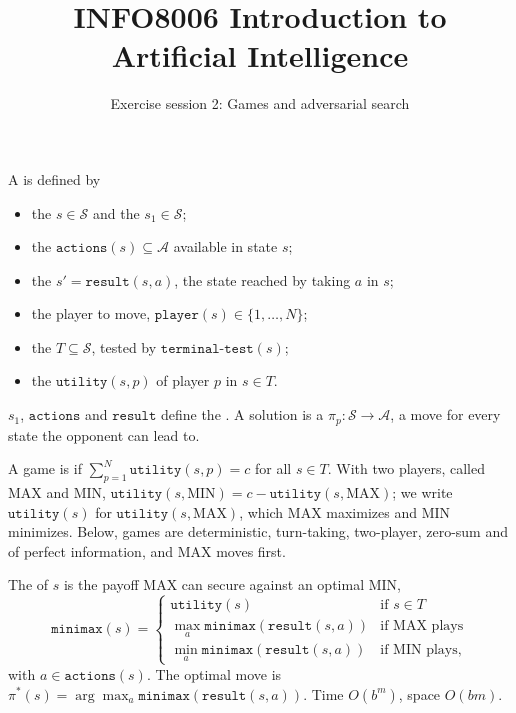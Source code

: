 \documentclass[11pt, a4paper]{exam}
\title{\bfseries INFO8006 Introduction to Artificial Intelligence}
\author{Exercise session 2: Games and adversarial search}
\date{}
\begin{document}
\maketitle

\begin{recap}
    A  is defined by
    \begin{itemize}
        \item the  $s \in \mathcal{S}$ and the  $s_1 \in \mathcal{S}$;
        \item the  $\texttt{actions}(s) \subseteq \mathcal{A}$ available in state $s$;
        \item the  $s' = \texttt{result}(s, a)$, the state reached by taking $a$ in $s$;
        \item the player to move, $\texttt{player}(s) \in \{1, \ldots, N\}$;
        \item the  $T \subseteq \mathcal{S}$, tested by $\texttt{terminal-test}(s)$;
        \item the  $\texttt{utility}(s, p)$ of player $p$ in $s \in T$.
    \end{itemize}
    $s_1$, $\texttt{actions}$ and $\texttt{result}$ define the . A solution is a  $\pi_p : \mathcal{S} \to \mathcal{A}$, a move for every state the opponent can lead to.

    A game is  if $\sum_{p=1}^N \texttt{utility}(s, p) = c$ for all $s \in T$. With two players, called MAX and MIN, $\texttt{utility}(s, \text{MIN}) = c - \texttt{utility}(s, \text{MAX})$; we write $\texttt{utility}(s)$ for $\texttt{utility}(s, \text{MAX})$, which MAX maximizes and MIN minimizes. Below, games are deterministic, turn-taking, two-player, zero-sum and of perfect information, and MAX moves first.

    The  of $s$ is the payoff MAX can secure against an optimal MIN,
    \[
        \texttt{minimax}(s) = \begin{cases}
            \texttt{utility}(s) & \text{if } s \in T \\
            \max_{a} \texttt{minimax}(\texttt{result}(s, a)) & \text{if MAX plays} \\
            \min_{a} \texttt{minimax}(\texttt{result}(s, a)) & \text{if MIN plays,}
        \end{cases}
    \]
    with $a \in \texttt{actions}(s)$. The optimal move is $\pi^*(s) = \arg\max_a \texttt{minimax}(\texttt{result}(s, a))$. Time $O(b^m)$, space $O(bm)$.


\end{recap}
\end{document}
